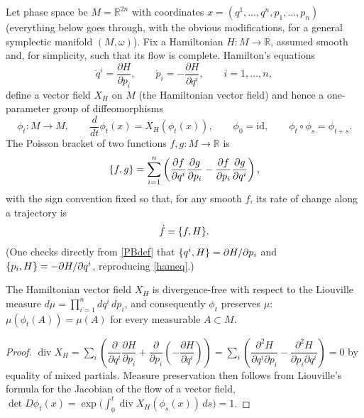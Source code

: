 Let phase space be $M=\mathbb R^{2n}$ with coordinates
$x=(q^1,\dots,q^n,p_1,\dots,p_n)$ (everything below goes through, with the
obvious modifications, for a general symplectic manifold $(M,\omega)$). Fix a
Hamiltonian $H:M\to\mathbb R$, assumed smooth and, for simplicity, such that its flow
is complete. Hamilton's equations
\begin{equation}
\dot q^i = \frac{\partial H}{\partial p_i}, 
    \qquad \dot p_i = -\frac{\partial H}{\partial q^i}, \qquad i=1,\dots,n,
\label{hameq}
\end{equation}
define a vector field $X_H$ on $M$ (the Hamiltonian vector field) and hence
a one-parameter group of diffeomorphisms
\begin{equation}
\phi_t : M \to M, \qquad \frac{d}{d t}\phi_t(x) = X_H(\phi_t(x)), 
    \qquad \phi_0=\mathrm{id}, \qquad \phi_t\circ\phi_s=\phi_{t+s}.
\label{flow}
\end{equation}
The Poisson bracket of two functions $f,g:M\to\mathbb R$ is
\begin{equation}
\{f,g\} = \sum_{i=1}^n\left(\frac{\partial f}{\partial q^i}
    \frac{\partial g}{\partial p_i}-\frac{\partial f}{\partial p_i}
    \frac{\partial g}{\partial q^i}\right),
\label{PBdef}
\end{equation}
with the sign convention fixed so that, for any smooth $f$, 
its rate of change along a trajectory is
\begin{equation}
\dot f = \{f,H\}.
\label{eom}
\end{equation}
(One checks directly from \eqref{PBdef} that 
$\{q^i,H\}=\partial H/\partial p_i$ and 
$\{p_i,H\}=-\partial H/\partial q^i$, reproducing \eqref{hameq}.)

\begin{proposition}
\label{liouville}
The Hamiltonian vector field $X_H$ is divergence-free with respect to the 
    Liouville measure $d\mu = \prod_{i=1}^n d q^i\,d p_i$, and 
    consequently $\phi_t$ preserves $\mu$: $\mu(\phi_t(A))=\mu(A)$ 
    for every measurable $A\subset M$.
\end{proposition}
\begin{proof}
$\operatorname{div}X_H = \sum_i\left(\dfrac{\partial}{\partial q^i}
    \dfrac{\partial H}{\partial p_i}+\dfrac{\partial}{\partial p_i}
    \left(-\dfrac{\partial H}{\partial q^i}\right)\right)=
    \sum_i\left(\dfrac{\partial^2 H}{\partial q^i\partial p_i}-
    \dfrac{\partial^2 H}{\partial p_i\partial q^i}\right)=0$ 
    by equality of mixed partials. Measure preservation then follows from 
    Liouville's formula for the Jacobian of the flow of a vector field, 
    $\det D\phi_t(x) = \exp\!\big(\int_0^t 
    \operatorname{div}X_H(\phi_s(x))\,d s\big)=1$.
\end{proof}

